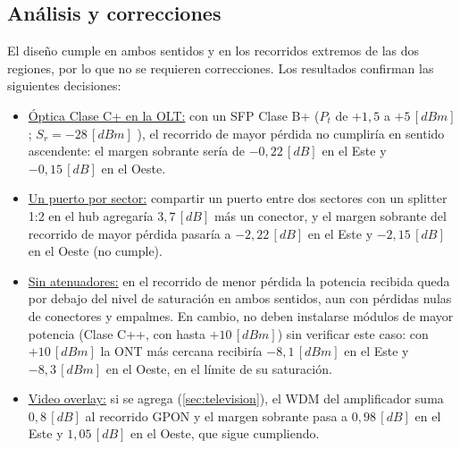 \subsection{Análisis y correcciones}
El diseño cumple en ambos sentidos y en los recorridos extremos de las dos regiones, por lo que no se requieren correcciones. Los resultados confirman las siguientes decisiones:
\begin{itemize}
    \item \underline{Óptica Clase C+ en la OLT:} con un SFP Clase B+ ($P_t$ de $+1{,}5$ a $+5 \, [dBm]$; $S_r = -28 \, [dBm]$ \cite{g984_2}), el recorrido de mayor pérdida no cumpliría en sentido ascendente: el margen sobrante sería de $-0{,}22 \, [dB]$ en el Este y $-0{,}15 \, [dB]$ en el Oeste.
    \item \underline{Un puerto por sector:} compartir un puerto entre dos sectores con un splitter 1:2 en el hub agregaría $3{,}7 \, [dB]$ más un conector, y el margen sobrante del recorrido de mayor pérdida pasaría a $-2{,}22 \, [dB]$ en el Este y $-2{,}15 \, [dB]$ en el Oeste (no cumple).
    \item \underline{Sin atenuadores:} en el recorrido de menor pérdida la potencia recibida queda por debajo del nivel de saturación en ambos sentidos, aun con pérdidas nulas de conectores y empalmes. En cambio, no deben instalarse módulos de mayor potencia (Clase C++, con hasta $+10 \, [dBm]$) sin verificar este caso: con $+10 \, [dBm]$ la ONT más cercana recibiría $-8{,}1 \, [dBm]$ en el Este y $-8{,}3 \, [dBm]$ en el Oeste, en el límite de su saturación.
    \item \underline{Video overlay:} si se agrega (\autoref{sec:television}), el WDM del amplificador suma $0{,}8 \, [dB]$ al recorrido GPON y el margen sobrante pasa a $0{,}98 \, [dB]$ en el Este y $1{,}05 \, [dB]$ en el Oeste, que sigue cumpliendo.
\end{itemize}
